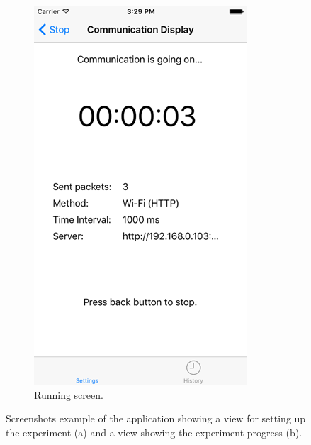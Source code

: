 \documentclass[journal]{vgtc}                %
\begin{document}
\begin{figure}
    \begin{subfigure}[b]{0.22\textwidth}
        \includegraphics[width=\textwidth]{running-screen}
        \caption{Running screen.}
        \label{fig:running-screen}
    \end{subfigure}
    \caption{Screenshots example of the application showing a view for setting up the experiment (a) and a view showing the experiment progress (b).}\label{fig:screenshot-example}
\end{figure}
\end{document}
